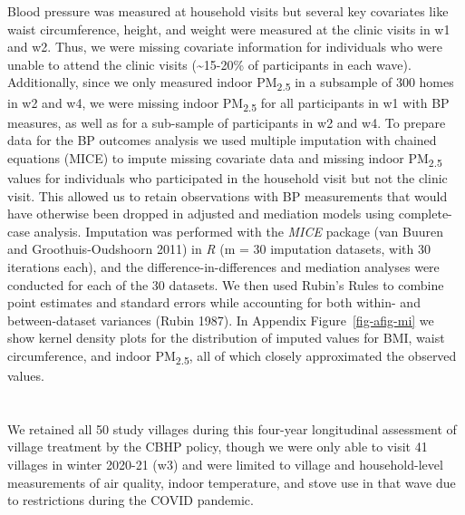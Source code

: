 \documentclass[
  letterpaper,
  DIV=11,
  numbers=noendperiod]{scrartcl}
\providecommand{\DIFaddtex}[1]{{\protect\color{blue}\uwave{#1}}} %
\providecommand{\DIFaddbegin}{} %
\providecommand{\DIFaddend}{} %
\providecommand{\DIFdelbegin}{} %
\providecommand{\DIFdelend}{} %
\providecommand{\DIFadd}[1]{\texorpdfstring{\DIFaddtex{#1}}{#1}} %
\newcommand{\DIFscaledelfig}{0.5}
\newlength{\DIFdelgraphicswidth} %
\newlength{\DIFdelgraphicsheight} %
\newcommand{\DIFaddincludegraphics}[2][]{{\color{blue}\fbox{\DIFOincludegraphics[#1]{#2}}}} %
\newcommand{\DIFdelincludegraphics}[2][]{%
\sbox{\DIFdelgraphicsbox}{\DIFOincludegraphics[#1]{#2}}%
\settoboxwidth{\DIFdelgraphicswidth}{\DIFdelgraphicsbox} %
\settoboxtotalheight{\DIFdelgraphicsheight}{\DIFdelgraphicsbox} %
\scalebox{\DIFscaledelfig}{%
\parbox[b]{\DIFdelgraphicswidth}{\usebox{\DIFdelgraphicsbox}\\[-\baselineskip] \rule{\DIFdelgraphicswidth}{0em}}\llap{\resizebox{\DIFdelgraphicswidth}{\DIFdelgraphicsheight}{%
\setlength{\unitlength}{\DIFdelgraphicswidth}%
\begin{picture}(1,1)%
\thicklines\linethickness{2pt} %
{\color[rgb]{1,0,0}\put(0,0){\framebox(1,1){}}}%
{\color[rgb]{1,0,0}\put(0,0){\line( 1,1){1}}}%
{\color[rgb]{1,0,0}\put(0,1){\line(1,-1){1}}}%
\end{picture}%
}\hspace*{3pt}}} %
} %
\DeclareRobustCommand{\DIFaddbegin}{\DIFOaddbegin \let\includegraphics\DIFaddincludegraphics} %
\DeclareRobustCommand{\DIFaddend}{\DIFOaddend \let\includegraphics\DIFOincludegraphics} %
\DeclareRobustCommand{\DIFdelbegin}{\DIFOdelbegin \let\includegraphics\DIFdelincludegraphics} %
\DeclareRobustCommand{\DIFdelend}{\DIFOaddend \let\includegraphics\DIFOincludegraphics} %
\begin{document}
Blood pressure was measured at household visits but several key
covariates like waist circumference, height, and weight were measured at
the clinic visits in w1 and w2. Thus, we were missing covariate
information for individuals who were unable to attend the clinic visits
(\textasciitilde15-20\% of participants in each wave). Additionally,
since we only measured indoor PM\textsubscript{2.5} in a subsample of
300 homes in w2 and w4, we were missing indoor PM\textsubscript{2.5} for
all participants in w1 with BP measures, as well as for a sub-sample of
participants in w2 and w4. To prepare data for the BP outcomes analysis
we used multiple imputation with chained equations (MICE) to impute
missing covariate data and missing indoor PM\textsubscript{2.5} values
for individuals who participated in the household visit but not the
clinic visit. This allowed us to retain observations with BP
measurements that would have otherwise been dropped in adjusted and
mediation models using complete-case analysis. Imputation was performed
with the \emph{MICE} package (van Buuren and Groothuis-Oudshoorn 2011)
in \emph{R} (m = 30 imputation datasets, with 30 iterations each), and
the difference-in-differences and mediation analyses were conducted for
each of the 30 datasets. We then used Rubin's Rules to combine point
estimates and standard errors while accounting for both within- and
between-dataset variances (Rubin 1987). In Appendix
Figure~\ref{fig-afig-mi} we show kernel density plots for the
distribution of imputed values for BMI, waist circumference, and indoor
PM\textsubscript{2.5}, all of which closely approximated the observed
values.

\DIFdelbegin %
\DIFdelend \DIFaddbegin \section{\DIFadd{Results}}\label{results-1}
\DIFaddend 

We retained all 50 study villages during this four-year longitudinal
assessment of village treatment by the CBHP policy, though we were only
able to visit 41 villages in winter 2020-21 (w3) and were limited to
village and household-level measurements of air quality, indoor
temperature, and stove use in that wave due to restrictions during the
COVID pandemic.
\end{document}
